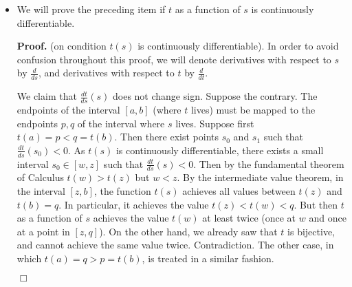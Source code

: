 \documentclass[12pt]{book}
\newenvironment{proof}[1][]{ \textbf{Proof#1.} }{$\Box$\medskip}
\begin{document}
\begin{itemize}
\item We will prove the preceding item if $t$ as a function of $s$ is  continuously differentiable.

\begin{proof} (on condition $t(s)$ is continuously differentiable). In order to avoid confusion throughout this proof, we will denote derivatives with respect to $s$ by $\frac{d}{ds}$, and derivatives with respect to $t$ by $\frac{d}{dt}$. 

We claim that $\frac{dt}{ds}(s)$ does not change sign. Suppose the contrary. The endpoints of the interval $[a,b]$ (where $t$ lives) must be mapped to the endpoints $p,q$ of the interval where $s$ lives. Suppose first $t(a)=p<q=t(b)$.  Then there exist points $s_0$ and $s_1$ such that  $\frac{dt}{ds}(s_0)<0$. As $t(s)$ is continuously differentiable, there exists a small interval  $s_0\in [w, z]$ such that $\frac{dt}{ds}(s)<0$. Then by the fundamental theorem of Calculus $t(w)>t(z)$ but $w<z$. By the intermediate value theorem, in the interval $[z,b]$, the function $t(s)$ achieves all values between $t(z)$ and $t(b)=q$. In particular, it achieves the value $t(z)<t(w)<q$. But then $t$ as a function of $s$ achieves the value $t(w)$ at least twice (once at $w$ and once at a point in $[z,q]$). On the other hand, we already saw that $t$ is bijective, and cannot achieve the same value twice. Contradiction. The other case, in which $t(a)=q>p=t(b)$, is treated in a similar fashion.


\end{proof}
\end{itemize}
\end{document}
